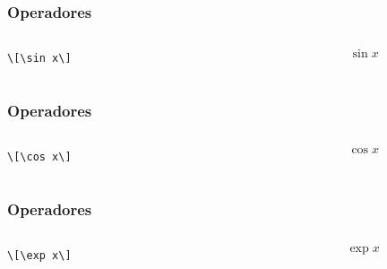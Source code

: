 \documentclass[12pt,aspectratio=169,ignorenonframetext]{ltxbeamer}
\begin{document}
\begin{frame}[fragile]
\frametitle{Operadores}

\begin{columns}
    \begin{column}{0.5\textwidth}
        \begin{verbatim}
\[\sin x\]
        \end{verbatim}
    \end{column}
    {\color{gray} \vline}
    \begin{column}{0.5\textwidth}
        \[\sin x\]
    \end{column}
\end{columns}
\end{frame}





\begin{frame}[fragile]
\frametitle{Operadores}

\begin{columns}
    \begin{column}{0.5\textwidth}
        \begin{verbatim}
\[\cos x\]
        \end{verbatim}
    \end{column}
    {\color{gray} \vline}
    \begin{column}{0.5\textwidth}
        \[\cos x\]
    \end{column}
\end{columns}
\end{frame}





\begin{frame}[fragile]
\frametitle{Operadores}

\begin{columns}
    \begin{column}{0.5\textwidth}
        \begin{verbatim}
\[\exp x\]
        \end{verbatim}
    \end{column}
    {\color{gray} \vline}
    \begin{column}{0.5\textwidth}
        \[\exp x\]
    \end{column}
\end{columns}
\end{frame}
\end{document}

